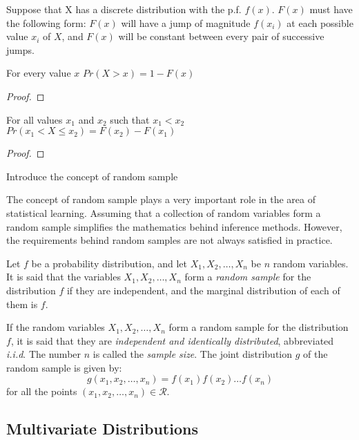 {\color{red}
Suppose that X has a discrete distribution with the p.f. $f\left(x\right)$. $F\left(x\right)$ must have the following form: $F\left(x\right)$ will have a jump of magnitude $f\left(x_{i}\right)$ at each possible value $x_{i}$ of $X$, and $F\left(x\right)$ will be constant between every pair of successive jumps.
}

\begin{proposition}
For every value $x$ $Pr\left(X>x\right)=1-F\left(x\right)$
\end{proposition}
\begin{proof}
\end{proof}

\begin{proposition}
For all values $x_{1}$ and $x_{2}$ such that $x_{\text{1}}<x_{2}$ $Pr\left(x_{1}<X\leq x_{2}\right)=F\left(x_{2}\right)-F\left(x_{1}\right)$
\end{proposition}
 \begin{proof}
\end{proof}

{\color{red} Introduce the concept of random sample}

The concept of random sample plays a very important role in the area of statistical learning. Assuming that a collection of random variables form a random sample simplifies the mathematics behind inference methods. However, the requirements behind random samples are not always satisfied in practice.

\begin{definition}
Let $f$ be a probability distribution, and let $X_1, X_2, \ldots, X_n$ be $n$ random variables. It is said that the variables $X_1, X_2, \ldots, X_n$ form a \emph{random sample} for the distribution $f$ if they are independent, and the marginal distribution of each of them is $f$. 
\end{definition}

If the random variables $X_1, X_2, \ldots, X_n$ form a random sample for the distribution $f$, it is said that they are \emph{independent and identically distributed}, abbreviated \emph{i.i.d}. The number $n$ is called the \emph{sample size}. The joint distribution $g$ of the random sample is given by:
\[
g \left( x_1, x_2, \ldots, x_n \right) = f \left( x_1 \right) f \left( x_2 \right) \ldots f \left( x_n \right)
\]
for all the points $\left( x_1, x_2, \ldots, x_n \right) \in \mathcal{R}$.


\subsection{Multivariate Distributions}

